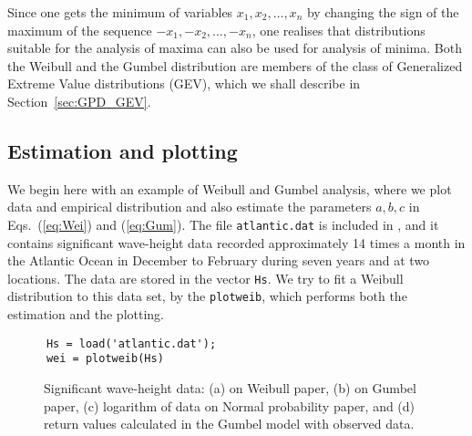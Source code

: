 Since one gets the  minimum of variables $x_1, x_2, \ldots, x_n$ by
changing the sign of the maximum of the sequence $-x_1, -x_2, \ldots , -x_n$, one
realises that distributions suitable for the analysis of maxima can
also be used for analysis of minima. Both the Weibull and the Gumbel
distribution are members of the class of Generalized Extreme Value
distributions (GEV), which we shall describe in Section~\ref{sec:GPD_GEV}.

\subsection{Estimation and plotting}\label{subsec:estimationandplotting}
We begin here with an example of Weibull and Gumbel analysis, where we
plot data and empirical distribution and also estimate the parameters
$a, b, c$ in Eqs.~(\ref{eq:Wei}) and (\ref{eq:Gum}).
The file {\tt atlantic.dat} is included in \progname{}, and it
contains significant wave-height data recorded approximately 14 times
a month in the Atlantic Ocean in December to February during seven
years and at two locations. The data are stored in the vector
{\tt Hs}. We try to fit a Weibull distribution to this data set, by
the  {\tt plotweib}, which performs both the estimation
and the plotting.
{\small\begin{verbatim}
      Hs = load('atlantic.dat');
      wei = plotweib(Hs)
\end{verbatim}}
\noindent

\begin{figure}[tbh]
%
\hfill
{}
\hspace{5mm}
  \caption[Significant wave-height data]{
Significant wave-height data: (a) on Weibull paper, (b) on
    Gumbel paper, (c) logarithm of data on Normal probability paper,
and (d) return values calculated in the Gumbel model with observed data.}
  \label{fig7-1}
\end{figure}

